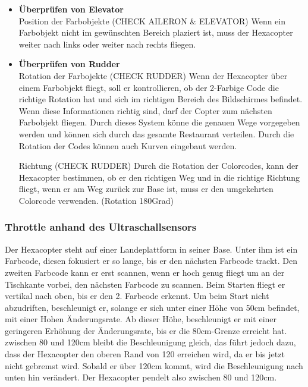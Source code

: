 \begin{itemize}
\begin{itemize}
        \item \textbf{Überprüfen von Elevator}\\
        Position der Farbobjekte (CHECK AILERON \& ELEVATOR)
        Wenn ein Farbobjekt nicht im gewünschten Bereich plaziert ist, muss der Hexacopter weiter nach links oder weiter nach rechts fliegen.
        \item \textbf{Überprüfen von Rudder}\\
        Rotation der Farbojekte (CHECK RUDDER)
        Wenn der Hexacopter über einem Farbobjekt fliegt, soll er kontrollieren, ob der 2-Farbige Code die richtige Rotation hat und sich im richtigen Bereich des Bildschirmes befindet. Wenn diese Informationen richtig sind, darf der Copter zum nächsten Farbobjekt fliegen.
        Durch dieses System könne die genauen Wege vorgegeben werden und können sich durch das gesamte Restaurant verteilen. Durch die Rotation der Codes können auch Kurven eingebaut werden.

        Richtung (CHECK RUDDER)
        Durch die Rotation der Colorcodes, kann der Hexacopter bestimmen, ob er den richtigen Weg und in die richtige Richtung fliegt, wenn er am Weg zurück zur Base ist, muss er den umgekehrten Colorcode verwenden. (Rotation 180Grad)
      \end{itemize}

    \subsubsection{Throttle anhand des Ultraschallsensors}

    Der Hexacopter steht auf einer Landeplattform in seiner Base. Unter ihm ist ein Farbcode, diesen fokusiert er so lange, bis er den nächsten Farbcode trackt. Den zweiten Farbcode kann er erst scannen, wenn er hoch genug fliegt um an der Tischkante vorbei, den nächsten Farbcode zu scannen.
    Beim Starten fliegt er vertikal nach oben, bis er den 2. Farbcode erkennt. Um beim Start nicht abzudriften, beschleunigt er, solange er sich unter einer Höhe von 50cm befindet, mit einer Hohen Änderungsrate. Ab dieser Höhe, beschleunigt er mit einer geringeren Erhöhung der Änderungsrate, bis er die 80cm-Grenze erreicht hat. 
    zwischen 80 und 120cm bleibt die Beschleunigung gleich, das führt jedoch dazu, dass der Hexacopter den oberen Rand von 120 erreichen wird, da er bis jetzt nicht gebremst wird. Sobald er über 120cm kommt, wird die Beschleunigung nach unten hin verändert. Der Hexacopter pendelt also zwischen 80 und 120cm.


\end{itemize}
